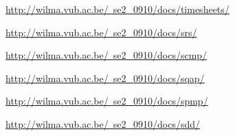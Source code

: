 \documentclass{article}
\begin{document}
\begin{thebibliography}{99}

	\href{http://wilma.vub.ac.be/~se2_0910/docs/timesheets/}{http://wilma.vub.ac.be/~se2_0910/docs/timesheets/}
	
	\href{http://wilma.vub.ac.be/~se2_0910/docs/srs/}{http://wilma.vub.ac.be/~se2_0910/docs/srs/}
	
	\href{http://wilma.vub.ac.be/~se2_0910/docs/scmp/}{http://wilma.vub.ac.be/~se2_0910/docs/scmp/}
	
	\href{http://wilma.vub.ac.be/~se2_0910/docs/sqap/}{http://wilma.vub.ac.be/~se2_0910/docs/sqap/}

	\href{http://wilma.vub.ac.be/~se2_0910/docs/spmp/}{http://wilma.vub.ac.be/~se2_0910/docs/spmp/}
	
	\href{http://wilma.vub.ac.be/~se2_0910/docs/sdd/}{http://wilma.vub.ac.be/~se2_0910/docs/sdd/}	
	
	
\end{thebibliography}
\end{document}
